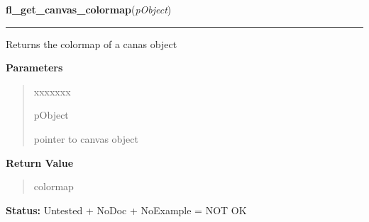 \hspace{.8\funcindent}\begin{boxedminipage}{\funcwidth}

    \raggedright \textbf{fl\_get\_canvas\_colormap}(\textit{pObject})

    \vspace{-1.5ex}

    \rule{\textwidth}{0.5\fboxrule}
\setlength{\parskip}{2ex}
    Returns the colormap of a canas object

\setlength{\parskip}{1ex}
      \textbf{Parameters}
      \vspace{-1ex}

      \begin{quote}
        \begin{Ventry}{xxxxxxx}

          \item[pObject]

          pointer to canvas object

        \end{Ventry}

      \end{quote}

      \textbf{Return Value}
    \vspace{-1ex}

      \begin{quote}
      colormap

      \end{quote}

\textbf{Status:} Untested + NoDoc + NoExample = NOT OK



    \end{boxedminipage}

    \label{xformslib:library:fl_get_canvas_depth}

    \vspace{0.5ex}


